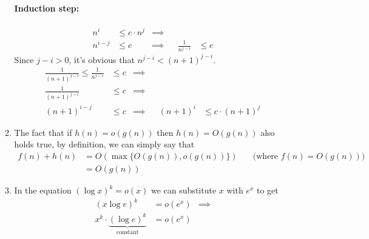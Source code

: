 \documentclass{article}
\begin{document}
\begin{enumerate}
\begin{enumerate}[label={(\arabic*)}]
{                \paragraph*{Induction step:}
                \begin{displaymath}
                    \begin{aligned}
                        n^i &\leq c \cdot n^j & \implies \\
                        n^{i - j} &\leq c & \implies &&
                        \frac{1}{n^{j - i}} &\leq c
                    \end{aligned}
                \end{displaymath}
                Since \(j - i > 0\), it's obvious that \(n^{j - i} < (n + 1)^{j - i}\).
                \begin{displaymath}
                    \begin{aligned}
                        \frac{1}{(n + 1)^{j - i}} \leq \frac{1}{n^{j - i}} &\leq c & \implies \\
                        \frac{1}{(n + 1)^{j - i}} &\leq c & \implies \\
                        (n + 1)^{i - j} &\leq c & \implies &&
                        (n + 1)^i &\leq c \cdot (n + 1)^j
                    \end{aligned}
                \end{displaymath}
            }
            \item {
                The fact that if \(h(n) = o(g(n))\) then \(h(n) = O(g(n))\) also holds true, by definition, we can simply say that
                \begin{displaymath}
                    \begin{aligned}
                        f(n) + h(n) &= O(\max\{O(g(n)), o(g(n))\}) \quad & \text{(where \(f(n) = O(g(n))\))}\\
                        &= O(g(n))
                    \end{aligned}
                \end{displaymath}
            }
            \item {
                In the equation \((\log x)^k = o(x)\) we can substitute \(x\) with \(e^x\) to get
                \begin{displaymath}
                    \begin{aligned}
                        \left(x\log e\right)^k &= o(e^x) & \implies \\
                        x^k\cdot\underbrace{\left(\log e\right)^k}_{\text{constant}} &= o(e^x)

\end{aligned}
\end{displaymath}}
\end{enumerate}
\end{enumerate}
\end{document}
